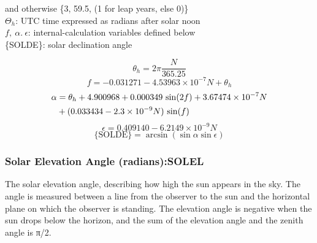 \documentclass[
]{book}
\begin{document}
\hspace*{0.333em}\hspace*{0.333em}\hspace*{0.333em}\hspace*{0.333em}\hspace*{0.333em}\hspace*{0.333em}and otherwise \{3, 59.5, (1 for leap years, else 0)\}\\
\(\Theta_h\): UTC time expressed as radians after solar noon\\
\(f,\ \alpha.\ \epsilon\): internal-calculation variables defined below\\
\{SOLDE\}: solar declination angle

\begin{equation}
\theta_{h}=2\pi\frac{N}{365.25}
\label{eq:SOLDEbox1}
\end{equation}
\begin{equation}
f=-0.031271-4.53963\times10^{-7}N+\theta_{h}
\label{eq:SOLDEbox2}
\end{equation}
\begin{align}
\alpha  &=  \theta_{h}+4.900968+0.000349\,\sin(2f)+3.67474\times10^{-7}N\notag \\
        &+(0.033434-2.3\times10^{-9}N)\,\sin(f)
\label{eq:SOLDEalpha}
\end{align}
\begin{equation}
\epsilon=0.409140-6.2149\times10^{-9}N
\label{eq:SOLDEeps}
\end{equation}
\begin{equation}
\mathrm{{\{SOLDE\}}=}\arcsin(\sin\alpha\sin\epsilon)
\label{eq:SOLDEbox}
\end{equation}

\hypertarget{solel}{%
\subsubsection*{Solar Elevation Angle (radians):SOLEL}\label{solel}}

The solar elevation angle, describing how high the sun appears in the sky. The angle is measured between a line from the observer to the sun and the horizontal plane on which the observer is standing. The elevation angle is negative when the sun drops below the horizon, and the sum of the elevation angle and the zenith angle is {π/2.}
\end{document}
